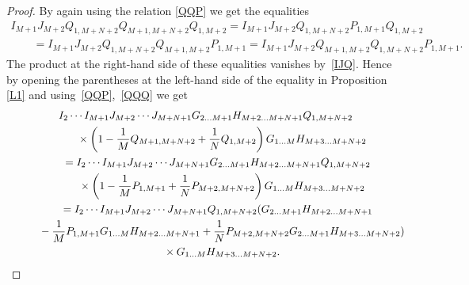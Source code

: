 \documentclass[pdftex]{sigma}
\numberwithin{equation}{section}
\begin{document}
\begin{proof}
By again using the relation \eqref{QQP} we get the equalities
\begin{gather*}
 I_{M+1} J_{M+2} Q_{1,M+N+2} Q_{M+1,M+N+2} Q_{1,M+2}=
I_{M+1} J_{M+2} Q_{1,M+N+2} P_{1,M+1} Q_{1,M+2}\\
\qquad{} =
I_{M+1} J_{M+2} Q_{1,M+N+2} Q_{M+1,M+2} P_{1,M+1}=
I_{M+1} J_{M+2} Q_{M+1,M+2} Q_{1,M+N+2} P_{1,M+1} .
\end{gather*}
The product at the right-hand side of these equalities
vanishes by~\eqref{IJQ}.
Hence by opening the parentheses at the left-hand side of the equality
in Proposition \ref{L1} and using~\eqref{QQP},~\eqref{QQQ} we get
\begin{gather}
I_{2} \cdots I_{M+1}
J_{M+2} \cdots J_{M+N+1}
G_{2 \dots M+1} H_{M+2 \dots M+N+1}
Q_{1,M+N+2}\nonumber\\
\qquad\quad {}\times
\left( 1-\frac1M Q_{M+1,M+N+2}+\frac1N Q_{1,M+2} \right)
G_{1 \dots M} H_{M+3 \dots M+N+2}\notag\\
\qquad{} =
I_{2} \cdots I_{M+1}
J_{M+2} \cdots J_{M+N+1}
G_{2 \dots M+1} H_{M+2 \dots M+N+1}
Q_{1,M+N+2}\notag\\
\qquad\quad {} \times
\left( 1-\frac1M P_{1,M+1}+\frac1N P_{M+2,M+N+2} \right)
G_{1 \dots M} H_{M+3 \dots M+N+2}\notag\\
\qquad {} =
I_{2} \cdots I_{M+1}
J_{M+2} \cdots J_{M+N+1}
Q_{1,M+N+2}
( G_{2 \dots M+1} H_{M+2 \dots M+N+1}\notag\\
\qquad\quad{}
-\frac1M P_{1,M+1}
G_{1 \dots M} H_{M+2 \dots M+N+1}
+\frac1N P_{M+2,M+N+2}
G_{2 \dots M+1} H_{M+3 \dots M+N+2} )\notag\\
\qquad\quad {} \times
G_{1 \dots M} H_{M+3 \dots M+N+2} .\label{chain}
\end{gather}


\end{proof}
\end{document}
